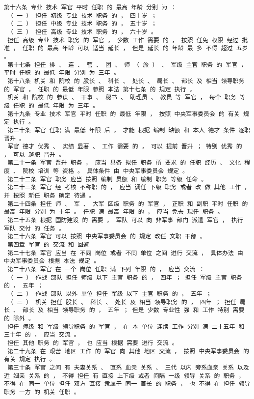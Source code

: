 \documentclass{article}
\begin{document}
\begin{Verbatim}[commandchars=\\\{\}]
 第十六条 专业 技术 军官 平时 任职 的 最高 年龄 分别 为 ： 
 （ 一 ） 担任 初级 专业 技术 职务 的 ， 四十岁 ； 
 （ 二 ） 担任 中级 专业 技术 职务 的 ， 五十岁 ； 
 （ 三 ） 担任 高级 专业 技术 职务 的 ， 六十岁 。 
 担任 高级 专业 技术 职务 的 军官 ， 少数 工作 需要 的 ， 按照 任免 权限 经过 批准 ， 任职 的 最高 年龄 可以 适当 延长 ， 但是 延长 的 年龄 最 多 不得 超过 五岁 。 
 第十七条 担任 排 、 连 、 营 、 团 、 师 （ 旅 ） 、 军级 主官 职务 的 军官 ， 平时 任职 的 最低 年限 分别 为 三年 。 
 第十八条 机关 和 院校 的 股长 、 科长 、 处长 、 局长 、 部长 及 相当 领导职务 的 军官 ， 任职 的 最低 年限 参照 本法 第十七条 的 规定 执行 。 
 机关 和 院校 的 参谋 、 干事 、 秘书 、 助理员 、 教员 等 军官 ， 每个 职务 等级 任职 的 最低 年限 为 三年 。 
 第十九条 专业 技术 军官 平时 任职 的 最低 年限 ， 按照 中央军事委员会 的 有关 规定 执行 。 
 第二十条 军官 任职 满 最低 年限 后 ， 才能 根据 编制 缺额 和 本人 德才 条件 逐职 晋升 。 
 军官 德才 优秀 、 实绩 显著 、 工作 需要 的 ， 可以 提前 晋升 ； 特别 优秀 的 ， 可以 越职 晋升 。 
 第二十一条 军官 晋升 职务 ， 应当 具备 拟任 职务 所 要求 的 任职 经历 、 文化 程度 、 院校 培训 等 资格 。 具体条件 由 中央军事委员会 规定 。 
 第二十二条 军官 职务 应当 按照 编制 员额 和 编制 职务 等级 任命 。 
 第二十三条 军官 经 考核 不称职 的 ， 应当 调任 下级 职务 或者 改 做 其他 工作 ， 并 按照 新任 职务 确定 待遇 。 
 第二十四条 担任 师 、 军 、 大军 区级 职务 的 军官 ， 正职 和 副职 平时 任职 的 最高 年限 分别 为 十年 。 任职 满 最高 年限 的 ， 应当 免去 现任 职务 。 
 第二十五条 根据 国防建设 的 需要 ， 军队 可以 向 非军事 部门 派遣 军官 ， 执行 军队 交付 的 任务 。 
 第二十六条 军官 可以 按照 中央军事委员会 的 规定 改任 文职 干部 。 
 第四章 军官 的 交流 和 回避 
 第二十七条 军官 应当 在 不同 岗位 或者 不同 单位 之间 进行 交流 ， 具体办法 由 中央军事委员会 根据 本法 规定 。 
 第二十八条 军官 在 一个 岗位 任职 满 下列 年限 的 ， 应当 交流 ： 
 （ 一 ） 作战 部队 担任 师级 以下 主官 职务 的 ， 四年 ； 担任 军级 主官 职务 的 ， 五年 ； 
 （ 二 ） 作战 部队 以外 单位 担任 军级 以下 主官 职务 的 ， 五年 ； 
 （ 三 ） 机关 担任 股长 、 科长 、 处长 及 相当 领导职务 的 ， 四年 ； 担任 局长 、 部长 及 相当 领导职务 的 ， 五年 ； 但是 少数 专业性 强 和 工作 特别 需要 的 除外 。 
 担任 师级 和 军级 领导职务 的 军官 ， 在 本 单位 连续 工作 分别 满 二十五年 和 三十年 的 ， 应当 交流 。 
 担任 其他 职务 的 军官 ， 也 应当 根据 需要 进行 交流 。 
 第二十九条 在 艰苦 地区 工作 的 军官 向 其他 地区 交流 ， 按照 中央军事委员会 的 有关 规定 执行 。 
 第三十条 军官 之间 有 夫妻关系 、 直系 血亲 关系 、 三代 以内 旁系血亲 关系 以及 近 姻亲 关系 的 ， 不得 担任 有 直接 上下级 或者 间隔 一级 领导 关系 的 职务 ， 不得 在 同一 单位 担任 双方 直接 隶属于 同一 首长 的 职务 ， 也 不得 在 担任 领导职务 一方 的 机关 任职 。 

\end{Verbatim}
\end{document}

